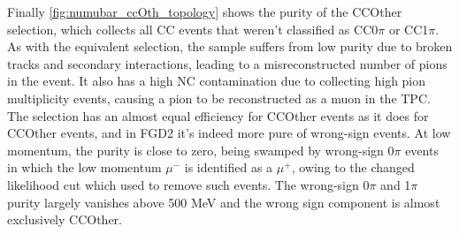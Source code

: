 Finally \autoref{fig:numubar_ccOth_topology} shows the purity of the \numubar CCOther selection, which collects all \numubar CC events that weren't classified as CC0$\pi$ or CC1$\pi$. As with the \numu equivalent selection, the sample suffers from low purity due to broken tracks and secondary interactions, leading to a misreconstructed number of pions in the event. It also has a high NC contamination due to collecting high pion multiplicity events, causing a pion to be reconstructed as a muon in the TPC. The selection has an almost equal efficiency for \numubar CCOther events as it does for \numu CCOther events, and in FGD2 it's indeed more pure of wrong-sign events. At low momentum, the purity is close to zero, being swamped by wrong-sign 0$\pi$ events in which the low momentum $\mu^-$ is identified as a $\mu^+$, owing to the changed likelihood cut which used to remove such events. The wrong-sign 0$\pi$ and 1$\pi$ purity largely vanishes above 500 MeV and the wrong sign component is almost exclusively \numu CCOther.
